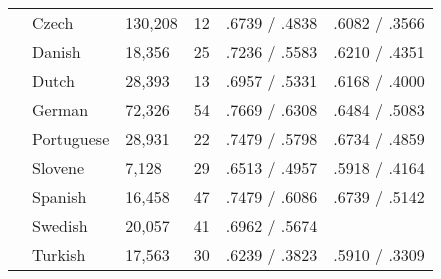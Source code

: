 \begin{table}[ht]
\begin{flushleft}
\begin{tabular}{|@{ }l@{ }|@{ }l@{ }|@{ }l@{ }|@{ }l@{ }|@{ }l@{ }|@{ }l@{ }|}
        & Czech      & 130,208 & 12 & .6739 / .4838 & .6082 / .3566\\
        & Danish     & 18,356  & 25 & .7236 / .5583 & .6210 / .4351\\
        & Dutch      & 28,393  & 13 & .6957 / .5331 & .6168 / .4000\\
        & German     & 72,326  & 54 & .7669 / .6308 & .6484 / .5083\\
        & Portuguese & 28,931  & 22 & .7479 / .5798 & .6734 / .4859\\
        & Slovene    & 7,128   & 29 & .6513 / .4957 & .5918 / .4164\\
        & Spanish    & 16,458  & 47 & .7479 / .6086 & .6739 / .5142\\
        & Swedish    & 20,057  & 41 & .6962 / .5674 &\\
        & Turkish    & 17,563  & 30 & .6239 / .3823 & .5910 / .3309\\ \hline
    \end{tabular}
  \end{flushleft}
  \label{tab:multiresults}
\end{table}
